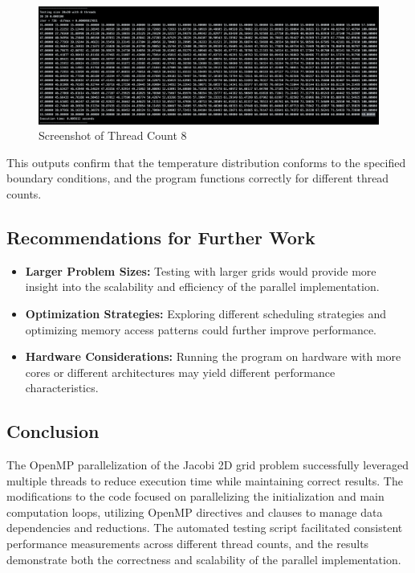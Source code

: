 \documentclass{article}
\begin{document}
\begin{figure}[H]
    \centering
    \includegraphics[width=\linewidth]{Images/Thread8.png}
    \caption{Screenshot of Thread Count 8}
    \label{fig:thread8}
\end{figure}

This outputs confirm that the temperature distribution conforms to the specified boundary conditions, and the program functions correctly for different thread counts.

\subsection{Recommendations for Further Work}

\begin{itemize}
    \item \textbf{Larger Problem Sizes:} Testing with larger grids would provide more insight into the scalability and efficiency of the parallel implementation.
    \item \textbf{Optimization Strategies:} Exploring different scheduling strategies and optimizing memory access patterns could further improve performance.
    \item \textbf{Hardware Considerations:} Running the program on hardware with more cores or different architectures may yield different performance characteristics.
\end{itemize}

\subsection{Conclusion}

The OpenMP parallelization of the Jacobi 2D grid problem successfully leveraged multiple threads to reduce execution time while maintaining correct results. The modifications to the code focused on parallelizing the initialization and main computation loops, utilizing OpenMP directives and clauses to manage data dependencies and reductions. The automated testing script facilitated consistent performance measurements across different thread counts, and the results demonstrate both the correctness and scalability of the parallel implementation.
\end{document}
